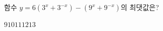 함수 $y=6(3^x+3^{-x})-(9^x+9^{-x})$의 최댓값은?
\begin{choices32}{$9$}{$10$}{$11$}{$12$}{$13$}\end{choices32}
